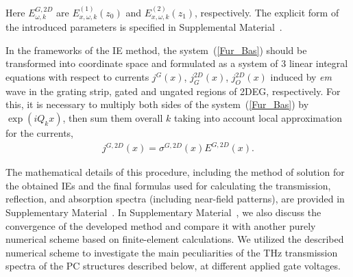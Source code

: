 \documentclass[%
 reprint,
 amsmath,amssymb,
 aps,
]{revtex4-2}
\begin{document}
Here $E^{G,2D}_{\omega,k}$ are $E^{(1)}_{x,\omega,k}(z_{0})$ and $E^{(2)}_{x,\omega,k}(z_{1})$, respectively. The explicit form of the introduced parameters is specified in Supplemental Material~\cite{suppl}.%

In the frameworks of the IE method, the system~(\ref{Fur_Bas}) should be transformed into coordinate space and formulated as a system of 3 linear integral equations with respect to currents $j^G (x)$, $j_G^{2D} (x)$, $j_O^{2D} (x)$  induced by \textit{em} wave in the grating strip, gated and ungated regions of 2DEG, respectively. For this, it is necessary to multiply both sides of the system~(\ref{Fur_Bas}) by $\exp(i Q_k x)$, then sum them overall $k$ taking into account local approximation for the currents,
 \begin{align} \label{Current1}
  j^{G, 2D}(x) = \sigma^{G, 2D}(x)E^{G, 2D}(x).
\end{align}


The mathematical details of this procedure, including the method of solution for the obtained IEs and the final formulas used for calculating the transmission, reflection, and absorption spectra (including near-field patterns), are provided in Supplementary Material~\cite{suppl}. In Supplementary Material~\cite{suppl}, we also discuss the convergence of the developed method and compare it with another purely numerical scheme based on finite-element calculations. We utilized the described numerical scheme to investigate the main peculiarities of the THz transmission spectra of the PC structures described below, at different applied gate voltages.
\end{document}
